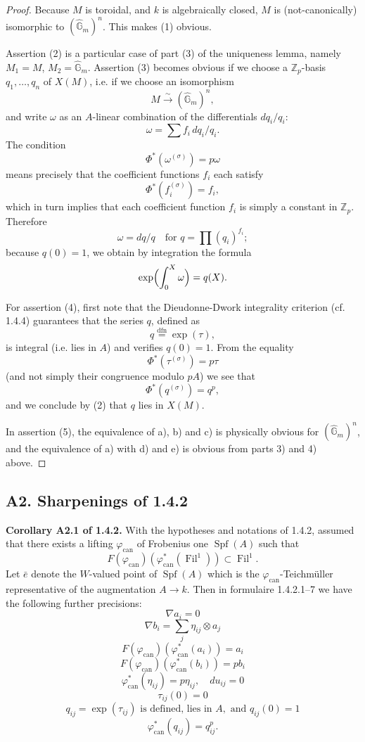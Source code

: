 \documentclass[12pt,a4paper]{article}
\theoremstyle{plain}
\theoremstyle{definition}
\theoremstyle{remark}
\DeclareMathOperator{\Fil}{Fil}
\DeclareMathOperator{\Spf}{Spf}
\begin{document}
\begin{proof}
Because $M$ is toroidal, and $k$ is algebraically closed, $M$ is (not-canonically) isomorphic to $(\hat{\mathbb{G}}_m)^n$. This makes (1) obvious.

Assertion (2) is a particular case of part (3) of the uniqueness lemma, namely $M_1 = M$, $M_2 = \hat{\mathbb{G}}_m$. Assertion (3) becomes obvious if we choose a $\mathbb{Z}_p$-basis $q_1, \ldots, q_n$ of $X(M)$, i.e. if we choose an isomorphism
\[
M \xrightarrow{\sim} (\hat{\mathbb{G}}_m)^n,
\]
and write $\omega$ as an $A$-linear combination of the differentials $dq_i/q_i$:
\[
\omega = \sum f_i \, dq_i/q_i.
\]
The condition
\[
\Phi^*(\omega^{(\sigma)}) = p\omega
\]
means precisely that the coefficient functions $f_i$ each satisfy
\[
\Phi^*(f_i^{(\sigma)}) = f_i,
\]
which in turn implies that each coefficient function $f_i$ is simply a constant in $\mathbb{Z}_p$. Therefore
\[
\omega = dq/q \quad \text{for } q = \prod (q_i)^{f_i};
\]
because $q(0) = 1$, we obtain by integration the formula
\[
\exp\Bigl(\int_0^X \omega\Bigr) = q(X).
\]

For assertion (4), first note that the Dieudonne-Dwork integrality criterion (cf. 1.4.4) guarantees that the series $q$, defined as
\[
q \overset{\mathrm{dfn}}{=} \exp(\tau),
\]
is integral (i.e. lies in $A$) and verifies $q(0) = 1$. From the equality
\[
\Phi^*(\tau^{(\sigma)}) = p\tau
\]
(and not simply their congruence modulo $pA$) we see that
\[
\Phi^*(q^{(\sigma)}) = q^p,
\]
and we conclude by (2) that $q$ lies in $X(M)$.

In assertion (5), the equivalence of a), b) and c) is physically obvious for $(\hat{\mathbb{G}}_m)^n$, and the equivalence of a) with d) and e) is obvious from parts 3) and 4) above. \qedhere
\end{proof}

\subsection*{A2. Sharpenings of 1.4.2}

\textbf{Corollary A2.1 of 1.4.2.} With the hypotheses and notations of 1.4.2, assumed that there exists a lifting $\varphi_{\mathrm{can}}$ of Frobenius one $\Spf(A)$ such that
\[
F(\varphi_{\mathrm{can}})(\varphi_{\mathrm{can}}^*(\Fil^1)) \subset \Fil^1.
\]
Let $\bar{e}$ denote the $W$-valued point of $\Spf(A)$ which is the $\varphi_{\mathrm{can}}$-Teichm\"uller representative of the augmentation $A \to k$. Then in formulaire 1.4.2.1--7 we have the following further precisions:
\[
\nabla a_i = 0
\]
\[
\nabla b_i = \sum_j \eta_{ij} \otimes a_j
\]
\[
F(\varphi_{\mathrm{can}})(\varphi_{\mathrm{can}}^*(a_i)) = a_i
\]
\[
F(\varphi_{\mathrm{can}})(\varphi_{\mathrm{can}}^*(b_i)) = pb_i
\]
\[
\varphi_{\mathrm{can}}^*(\eta_{ij}) = p\eta_{ij}, \quad du_{ij} = 0
\]
\[
\tau_{ij}(0) = 0
\]
\[
q_{ij} = \exp(\tau_{ij}) \text{ is defined, lies in } A, \text{ and } q_{ij}(0) = 1
\]
\[
\varphi_{\mathrm{can}}^*(q_{ij}) = q_{ij}^p.
\]
\end{document}
